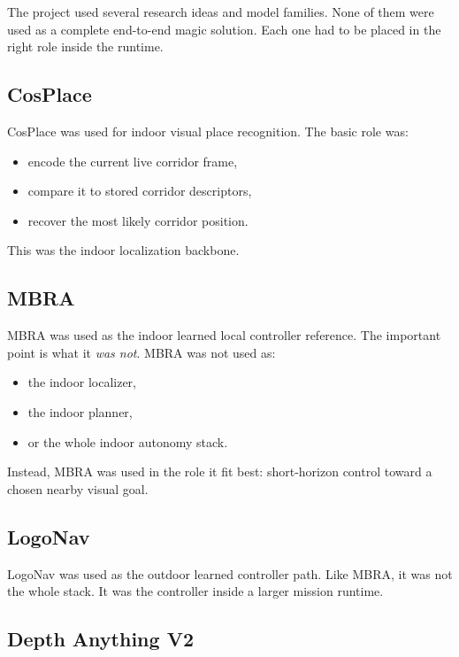 \documentclass[11pt]{article}
\begin{document}
The project used several research ideas and model families. None of them were used
as a complete end-to-end magic solution. Each one had to be placed in the right
role inside the runtime.

\subsection{CosPlace}

CosPlace was used for indoor visual place recognition. The basic role was:

\begin{itemize}[nosep]
  \item encode the current live corridor frame,
  \item compare it to stored corridor descriptors,
  \item recover the most likely corridor position.
\end{itemize}

This was the indoor localization backbone.

\subsection{MBRA}

MBRA was used as the indoor learned local controller reference. The important point
is what it \emph{was not}. MBRA was not used as:

\begin{itemize}[nosep]
  \item the indoor localizer,
  \item the indoor planner,
  \item or the whole indoor autonomy stack.
\end{itemize}

Instead, MBRA was used in the role it fit best: short-horizon control toward a
chosen nearby visual goal.

\subsection{LogoNav}

LogoNav was used as the outdoor learned controller path. Like MBRA, it was not the
whole stack. It was the controller inside a larger mission runtime.

\subsection{Depth Anything V2}
\end{document}
